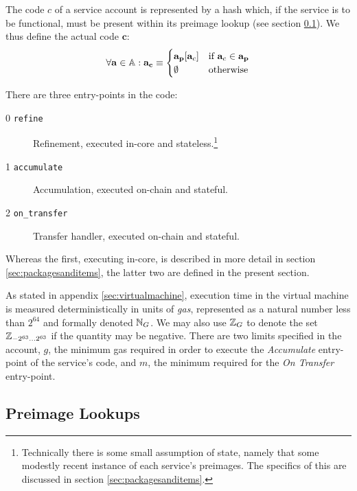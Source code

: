 The code $c$ of a service account is represented by a hash which, if the service is to be functional, must be present within its preimage lookup (see section \ref{sec:lookups}). We thus define the actual code $\mathbf{c}$:
\begin{align}
  \forall \mathbf{a} \in \mathbb{A} : \mathbf{a}_\mathbf{c} \equiv \begin{cases}
    \mathbf{a}_\mathbf{p}[\mathbf{a}_c] &\text{if } \mathbf{a}_c \in \mathbf{a}_\mathbf{p} \\
    \emptyset &\text{otherwise}
  \end{cases}
\end{align}

There are three entry-points in the code:
\begin{description}
  \item[0 \texttt{refine}]Refinement, executed in-core and stateless.\footnote{Technically there is some small assumption of state, namely that some modestly recent instance of each service's preimages. The specifics of this are discussed in section \ref{sec:packagesanditems}.}
  \item[1 \texttt{accumulate}] Accumulation, executed on-chain and stateful.
  \item[2 \texttt{on\_transfer}] Transfer handler, executed on-chain and stateful.
\end{description}

Whereas the first, executing in-core, is described in more detail in section \ref{sec:packagesanditems}, the latter two are defined in the present section.

As stated in appendix \ref{sec:virtualmachine}, execution time in the \Jam virtual machine is measured deterministically in units of \emph{gas}, represented as a natural number less than $2^{64}$ and formally denoted $\mathbb{N}_G$. We may also use $\mathbb{Z}_G$ to denote the set $\mathbb{Z}_{-2^{63}\dots2^{63}}$ if the quantity may be negative. There are two limits specified in the account, $g$, the minimum gas required in order to execute the \emph{Accumulate} entry-point of the service's code, and $m$, the minimum required for the \emph{On Transfer} entry-point.










\subsection{Preimage Lookups}\label{sec:lookups}

